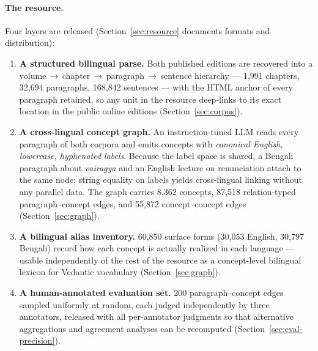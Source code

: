 \documentclass[pdflatex,sn-mathphys-num]{sn-jnl}
\begin{document}
\paragraph{The resource.} Four layers are released
(Section~\ref{sec:resource} documents formats and distribution):

\begin{enumerate}[leftmargin=1.4em]
  \item \textbf{A structured bilingual parse.} Both published editions are
  recovered into a volume\,$\to$\,chapter\,$\to$\,paragraph\,$\to$\,sentence
  hierarchy --- 1{,}991 chapters, 32{,}694 paragraphs, 168{,}842
  sentences --- with the HTML anchor of every paragraph retained, so any
  unit in the resource deep-links to its exact location in the public
  online editions (Section~\ref{sec:corpus}).
  \item \textbf{A cross-lingual concept graph.} An instruction-tuned LLM
  reads every paragraph of both corpora and emits concepts with
  \emph{canonical English, lowercase, hyphenated labels}. Because the
  label space is shared, a Bengali paragraph about \emph{vairagya} and an
  English lecture on renunciation attach to the same node; string
  equality on labels yields cross-lingual linking without any parallel
  data. The graph carries 8{,}362 concepts, 87{,}518 relation-typed
  paragraph--concept edges, and 55{,}872 concept--concept edges
  (Section~\ref{sec:graph}).
  \item \textbf{A bilingual alias inventory.} 60{,}850 surface forms
  (30{,}053 English, 30{,}797 Bengali) record how each concept is actually
  realized in each language --- usable independently of the rest of the
  resource as a concept-level bilingual lexicon for Vedantic vocabulary
  (Section~\ref{sec:graph}).
  \item \textbf{A human-annotated evaluation set.} 200 paragraph--concept
  edges sampled uniformly at random, each judged independently by three
  annotators, released with all per-annotator judgments so that alternative
  aggregations and agreement analyses can be recomputed
  (Section~\ref{sec:eval-precision}).
\end{enumerate}
\end{document}

